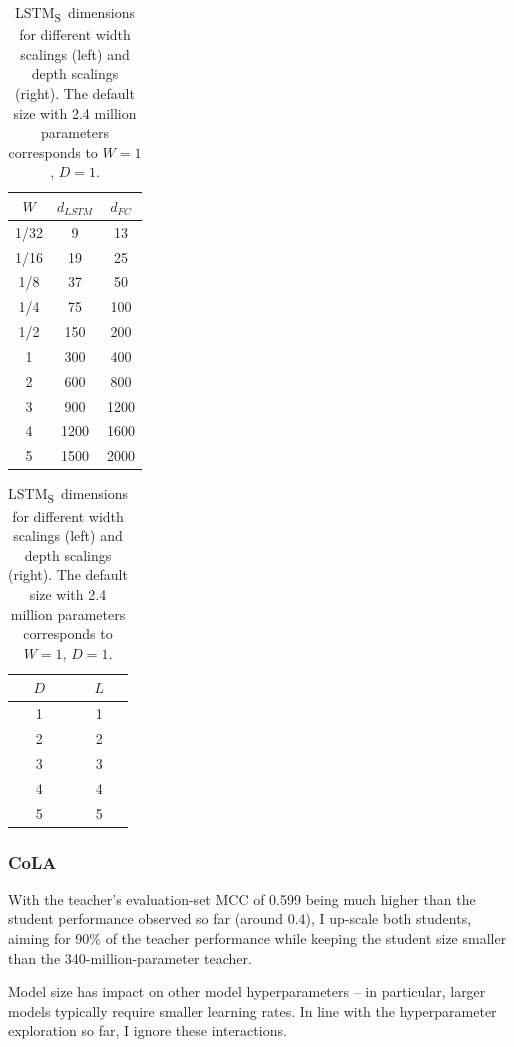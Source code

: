 \documentclass[bsc,frontabs,twoside,singlespacing,parskip,deptreport]{infthesis}
\def\LSTMS{LSTM\textsubscript{S}}
\begin{document}
{{{{        \begin{table}[h!t]
        \centering
        \begin{tabular}{c|cc}
        \hline
        $W$ & $d_{LSTM}$  & $d_{FC}$\\ 
        \hline
        1/32& 9           & 13 \\
        1/16& 19          & 25 \\
        1/8 & 37          & 50 \\
        1/4 & 75          & 100 \\
        1/2 & 150         & 200 \\
        1   & 300         & 400 \\
        2   & 600         & 800 \\
        3   & 900         & 1200 \\
        4   & 1200        & 1600 \\
        5   & 1500        & 2000 \\
        \hline
        \end{tabular}
        \quad \quad \quad \quad
        \begin{tabular}{c|c}
        \hline
        $D$ & $L$ \\
        \hline
        1   & 1  \\
        2   & 2  \\
        3   & 3  \\
        4   & 4  \\
        5   & 5  \\
        \hline
        \end{tabular}
        \caption{\LSTMS~dimensions for different width scalings (left) and depth scalings (right). The default size with 2.4 million parameters corresponds to $W=1$, $D=1$.}
        \label{tab:sizes-lstm}
        \end{table}

        \subsubsection{CoLA}{
          With the teacher's evaluation-set MCC of 0.599 being much higher than the student performance observed so far (around 0.4), I up-scale both students, aiming for 90\% of the teacher performance while keeping the student size smaller than the 340-million-parameter teacher.


        }

        Model size has impact on other model hyperparameters -- in particular, larger models typically require smaller learning rates. In line with the hyperparameter exploration so far, I ignore these interactions.

}}}}
\end{document}
